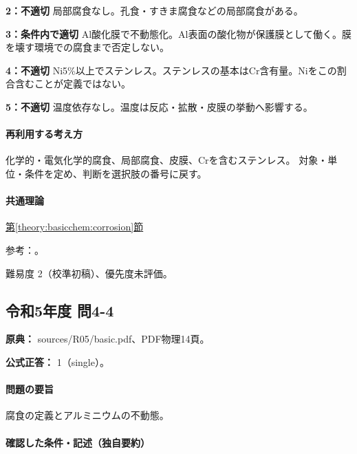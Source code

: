 \noindent\textbf{2：不適切} 局部腐食なし。孔食・すきま腐食などの局部腐食がある。\par

\noindent\textbf{3：条件内で適切} Al酸化膜で不動態化。Al表面の酸化物が保護膜として働く。膜を壊す環境での腐食まで否定しない。\par

\noindent\textbf{4：不適切} Ni5\%以上でステンレス。ステンレスの基本はCr含有量。Niをこの割合含むことが定義ではない。\par

\noindent\textbf{5：不適切} 温度依存なし。温度は反応・拡散・皮膜の挙動へ影響する。\par

\paragraph{再利用する考え方} 化学的・電気化学的腐食、局部腐食、皮膜、Crを含むステンレス。 対象・単位・条件を定め、判断を選択肢の番号に戻す。

\paragraph{共通理論} \hyperref[theory:basicchem:corrosion]{第\ref*{theory:basicchem:corrosion}節}

\par 参考：\cite{stainless_definition2022,chem55_corrosion}。

\par 難易度 2（校準初稿）、優先度未評価。

\subsection{令和5年度 問4-4}
\label{q:r05-reg-basic-4-4}

\noindent\textbf{原典：} sources/R05/basic.pdf、PDF物理14頁。

\textbf{公式正答：} 1（single）。

\paragraph{問題の要旨} 腐食の定義とアルミニウムの不動態。

\paragraph{確認した条件・記述（独自要約）}\mbox{}\par

